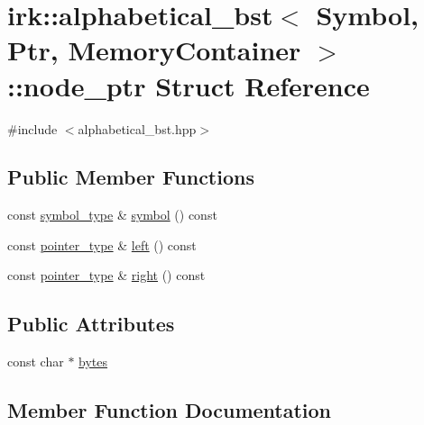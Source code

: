 \hypertarget{structirk_1_1alphabetical__bst_1_1node__ptr}{}\section{irk\+:\+:alphabetical\+\_\+bst$<$ Symbol, Ptr, Memory\+Container $>$\+:\+:node\+\_\+ptr Struct Reference}
\label{structirk_1_1alphabetical__bst_1_1node__ptr}


{\ttfamily \#include $<$alphabetical\+\_\+bst.\+hpp$>$}

\subsection*{Public Member Functions}
\begin{DoxyCompactItemize}
\item 
const \mbox{\hyperlink{classirk_1_1alphabetical__bst_a296ccb8fa9fa9dce3b3c3beab0a5ca28}{symbol\+\_\+type}} \& \mbox{\hyperlink{structirk_1_1alphabetical__bst_1_1node__ptr_a8a8eaa5ac49c5c7b19e3dd1d416a023b}{symbol}} () const
\item 
const \mbox{\hyperlink{classirk_1_1alphabetical__bst_ae689c05ab96a71769e24908d5c73765c}{pointer\+\_\+type}} \& \mbox{\hyperlink{structirk_1_1alphabetical__bst_1_1node__ptr_ab55156d17cd292c4748e6000b3edb205}{left}} () const
\item 
const \mbox{\hyperlink{classirk_1_1alphabetical__bst_ae689c05ab96a71769e24908d5c73765c}{pointer\+\_\+type}} \& \mbox{\hyperlink{structirk_1_1alphabetical__bst_1_1node__ptr_a11bac9c1ab6dc6a2b395a02c334bd535}{right}} () const
\end{DoxyCompactItemize}
\subsection*{Public Attributes}
\begin{DoxyCompactItemize}
\item 
const char $\ast$ \mbox{\hyperlink{structirk_1_1alphabetical__bst_1_1node__ptr_afc089ea68fd618ec88d8acb2556d49e8}{bytes}}
\end{DoxyCompactItemize}


\subsection{Member Function Documentation}
\mbox{\label{structirk_1_1alphabetical__bst_1_1node__ptr_ab55156d17cd292c4748e6000b3edb205}} 
